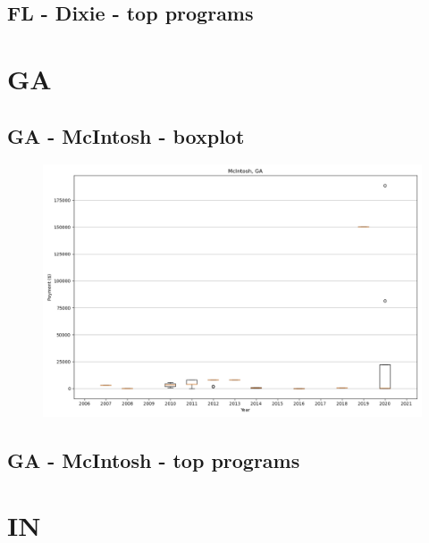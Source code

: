 \subsection*{FL - Dixie - top programs}

\newpage
\section*{GA}
\subsection*{GA - McIntosh - boxplot}
\begin{figure}[h]
\centering
\includegraphics[width=7in]{../output/boxplots/counties/McIntosh-GA_boxplot.png}
\end{figure}


\subsection*{GA - McIntosh - top programs}

\newpage
\section*{IN}
